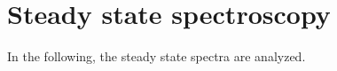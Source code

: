 \section{Steady state spectroscopy}
\label{sec:SSS}

In the following, the steady state spectra are analyzed.

